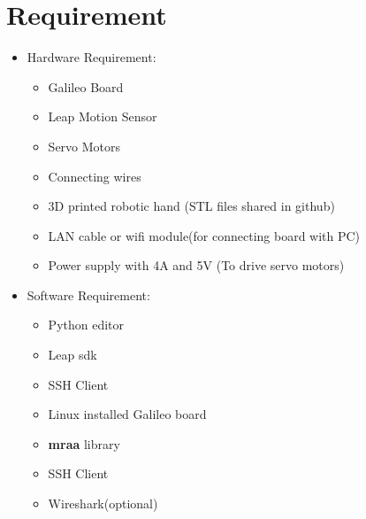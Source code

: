 \documentclass[11pt,a4paper]{article}
\begin{document}
	\section{Requirement}
	\vspace{1cm}
	\begin{itemize}
	    \item Hardware Requirement:
	    \begin{itemize}
	        \item Galileo Board
	        \item Leap Motion Sensor
	        \item Servo Motors
	        \item Connecting wires
	        \item 3D printed robotic hand (STL files shared in github)
	        \item LAN cable or wifi module(for connecting board with PC)
	        \item Power supply with 4A and 5V (To drive servo motors)
	    \end{itemize}
	    \vspace{1cm}
	    \item Software Requirement:
	    \begin{itemize}
	        \item Python editor
	        \item Leap sdk
	        \item SSH Client
	        \item Linux installed Galileo board
	        \item \textbf{mraa} library
	        \item SSH Client
	        \item Wireshark(optional)
	    \end{itemize}
	\end{itemize}
	\newpage
\end{document}
